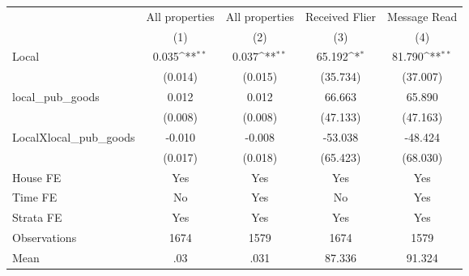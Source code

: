 {
\def\sym#1{\ifmmode^{#1}\else\(^{#1}\)\fi}
\begin{tabular}{l*{4}{c}}
\hline\hline
                &\multicolumn{1}{c}{All properties}&\multicolumn{1}{c}{All properties}&\multicolumn{1}{c}{Received Flier}&\multicolumn{1}{c}{Message Read}\\
                &\multicolumn{1}{c}{(1)}         &\multicolumn{1}{c}{(2)}         &\multicolumn{1}{c}{(3)}         &\multicolumn{1}{c}{(4)}         \\
\hline
Local           &    0.035\sym{**} &    0.037\sym{**} &   65.192\sym{*}  &   81.790\sym{**} \\
                &  (0.014)         &  (0.015)         & (35.734)         & (37.007)         \\
local\_pub\_goods &    0.012         &    0.012         &   66.663         &   65.890         \\
                &  (0.008)         &  (0.008)         & (47.133)         & (47.163)         \\
LocalXlocal\_pub\_goods&   -0.010         &   -0.008         &  -53.038         &  -48.424         \\
                &  (0.017)         &  (0.018)         & (65.423)         & (68.030)         \\
House FE        &      Yes         &      Yes         &      Yes         &      Yes         \\
Time FE         &       No         &      Yes         &       No         &      Yes         \\
Strata FE       &      Yes         &      Yes         &      Yes         &      Yes         \\
\hline
Observations    &     1674         &     1579         &     1674         &     1579         \\
Mean            &      .03         &     .031         &   87.336         &   91.324         \\
\hline\hline
\end{tabular}
}
